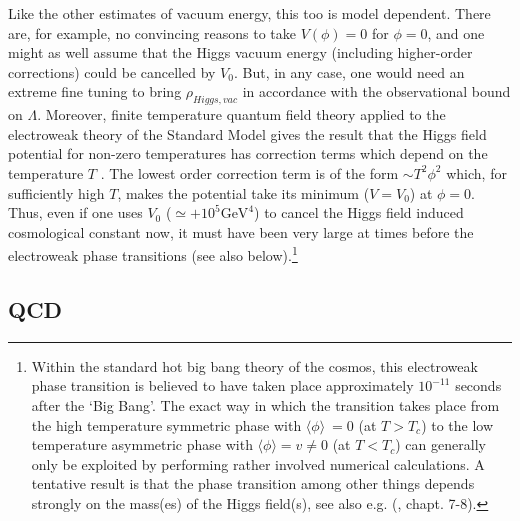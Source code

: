 \documentclass[12pt]{article}
\def\ss{\subsection}
\begin{document}
Like the other estimates of vacuum energy, this too is model
dependent. There are, for example, no convincing reasons to take
$V(\phi)=0$ for $\phi =0$, and one might as well assume that the
Higgs vacuum energy (including higher-order corrections) could be
cancelled by $V_0$. But, in any case, one would need an extreme
fine tuning to bring $\rho _{Higgs,vac}$ in accordance with the
observational bound on $\Lambda$. Moreover, finite temperature
quantum field theory applied to the electroweak theory of the
Standard Model gives the result that the Higgs field potential for
non-zero temperatures has correction terms which depend on the
temperature $T$ \cite{kolb93}. The lowest order correction term is
of the form $\sim T^2\phi ^2$ which, for sufficiently high $T$,
makes the potential take its minimum ($V=V_0$) at $\phi =0$. Thus,
even if one uses $V_0$ ($\simeq + 10^5 \mbox{GeV}^4$) to cancel
the Higgs field induced cosmological constant now, it must have
been very large at times before the electroweak phase transitions
(see also below).\footnote{Within the standard hot big bang theory
of the cosmos, this electroweak phase transition is believed to
have taken place approximately $10^{-11}$ seconds after the `Big
Bang'. The exact way in which the transition takes place from the high
temperature symmetric phase with $\langle\phi\rangle \ = 0$ (at $T>T_c$) to the
low temperature asymmetric phase with $\langle\phi\rangle  = v \neq 0$ (at
$T<T_c$) can generally only be exploited by performing
rather involved numerical calculations. A tentative result is that
the phase transition among other things depends strongly on the
mass(es) of the Higgs field(s), see also e.g. (\cite{kolb93},
chapt. 7-8).} 

\ss{QCD}
\end{document}
